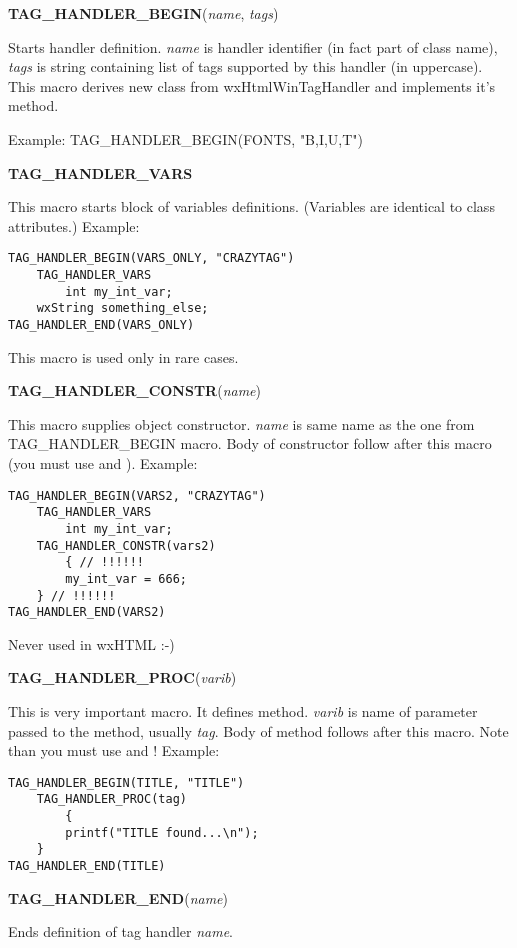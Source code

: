 {\bf TAG_HANDLER_BEGIN}({\it name}, {\it tags})

Starts handler definition. {\it name} is handler identifier (in fact
part of class name), {\it tags} is string containing list of tags
supported by this handler (in uppercase). This macro derives new class from
wxHtmlWinTagHandler and implements it's 
 method.

Example: TAG_HANDLER_BEGIN(FONTS, "B,I,U,T")

{\bf TAG_HANDLER_VARS}

This macro starts block of variables definitions. (Variables are identical
to class attributes.) Example:

\begin{verbatim}
TAG_HANDLER_BEGIN(VARS_ONLY, "CRAZYTAG")
    TAG_HANDLER_VARS
        int my_int_var;
	wxString something_else;
TAG_HANDLER_END(VARS_ONLY)
\end{verbatim}

This macro is used only in rare cases.

{\bf TAG_HANDLER_CONSTR}({\it name})

This macro supplies object constructor. {\it name} is same name as the one
from TAG_HANDLER_BEGIN macro. Body of constructor follow after
this macro (you must use { and } ). Example:

\begin{verbatim}
TAG_HANDLER_BEGIN(VARS2, "CRAZYTAG")
    TAG_HANDLER_VARS
        int my_int_var;
    TAG_HANDLER_CONSTR(vars2)
        { // !!!!!!
	    my_int_var = 666;
	} // !!!!!!
TAG_HANDLER_END(VARS2)
\end{verbatim}

Never used in wxHTML :-)

{\bf TAG_HANDLER_PROC}({\it varib})

This is very important macro. It defines 
method. {\it varib} is name of parameter passed to the method, usually
{\it tag}. Body of method follows after this macro.
Note than you must use { and } ! Example:

\begin{verbatim}
TAG_HANDLER_BEGIN(TITLE, "TITLE")
    TAG_HANDLER_PROC(tag)
        {
	    printf("TITLE found...\n");
	}
TAG_HANDLER_END(TITLE)
\end{verbatim}

{\bf TAG_HANDLER_END}({\it name})

Ends definition of tag handler {\it name}. 


